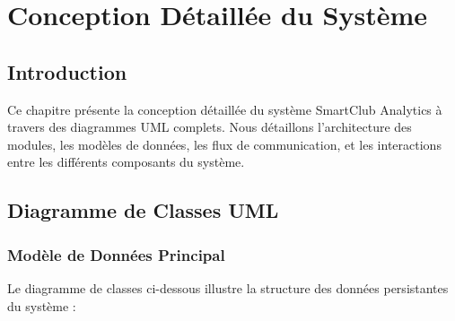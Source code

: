 \chapter{Conception Détaillée du Système}

\section{Introduction}

Ce chapitre présente la conception détaillée du système SmartClub Analytics à travers des diagrammes UML complets. Nous détaillons l'architecture des modules, les modèles de données, les flux de communication, et les interactions entre les différents composants du système.

\section{Diagramme de Classes UML}

\subsection{Modèle de Données Principal}

Le diagramme de classes ci-dessous illustre la structure des données persistantes du système :

